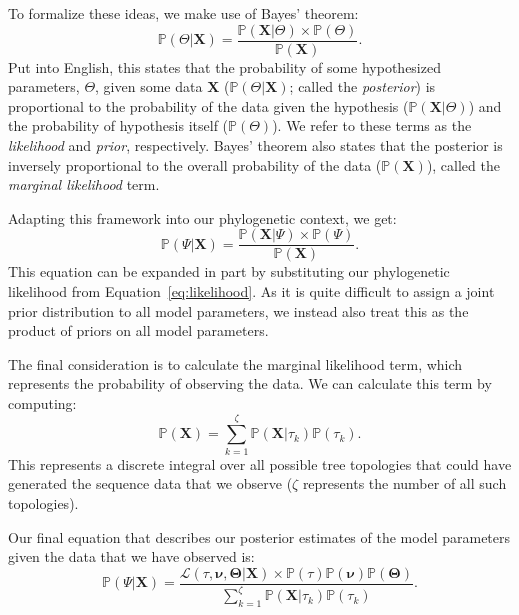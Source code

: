 To formalize these ideas, we make use of Bayes' theorem:
\begin{equation}
  \mathbb{P}(\Theta|\mathbf{X}) = \frac{\mathbb{P}(\mathbf{X}|\Theta) \times \mathbb{P}(\Theta)}{\mathbb{P}(\mathbf{X})}.
\end{equation}
Put into English, this states that the probability of some hypothesized parameters, $\Theta$, given some data $\mathbf{X}$ ($\mathbb{P}(\Theta|\mathbf{X})$; called the \textit{posterior}) is proportional to the probability of the data given the hypothesis ($\mathbb{P}(\mathbf{X}|\Theta)$) and the probability of hypothesis itself ($\mathbb{P}(\Theta)$).
We refer to these terms as the \textit{likelihood} and \textit{prior}, respectively.
Bayes' theorem also states that the posterior is inversely proportional to the overall probability of the data ($\mathbb{P}(\mathbf{X})$), called the \textit{marginal likelihood} term.

Adapting this framework into our phylogenetic context, we get:
\begin{equation}
  \mathbb{P}(\Psi|\mathbf{X}) = \frac{\mathbb{P}(\mathbf{X}|\Psi) \times \mathbb{P}(\Psi)}{\mathbb{P}(\mathbf{X})}.
\end{equation}
This equation can be expanded in part by substituting our phylogenetic likelihood from Equation~\ref{eq:likelihood}.
As it is quite difficult to assign a joint prior distribution to all model parameters, we instead also treat this as the product of priors on all model parameters.

The final consideration is to calculate the marginal likelihood term, which represents the probability of observing the data.
We can calculate this term by computing:
\begin{equation}
  \label{eq:marginalTerm}
  \mathbb{P}(\mathbf{X}) = \sum_{k=1}^{\zeta} \mathbb{P}(\mathbf{X}|\tau_k)\mathbb{P}(\tau_k).
\end{equation}
This represents a discrete integral over all possible tree topologies that could have generated the sequence data that we observe ($\zeta$ represents the number of all such topologies).

Our final equation that describes our posterior estimates of the model parameters given the data that we have observed is:
\begin{equation}
  \label{eq:posteriorLikelihood}
  \mathbb{P}(\Psi|\mathbf{X}) = 
    \frac{\mathcal{L}(\tau,\mathbf{\nu},\mathbf{\Theta}|\mathbf{X}) \times \mathbb{P}(\tau)\mathbb{P}(\mathbf{\nu})\mathbb{P}(\mathbf{\Theta})}
    {\sum_{k=1}^{\zeta} \mathbb{P}(\mathbf{X}|\tau_k)\mathbb{P}(\tau_k)}.
\end{equation}

